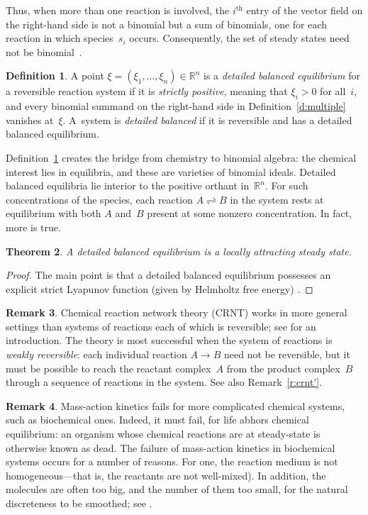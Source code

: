 \documentclass[12pt]{amsart}
\numberwithin{equation}{section}
\newtheorem{thm}{Theorem}[section]
\theoremstyle{definition}
\newtheorem{defn}[thm]{Definition}
\newtheorem{remark}[thm]{Remark}
\begin{document}
Thus, when more than one reaction is involved, the $i^{\mathrm{th}}$ entry of
the vector field on the right-hand side is not a binomial but a sum of
binomials, one for each reaction in which species~$s_i$ occurs.
Consequently, the set of steady states need not be
binomial~\cite{balancing}.

\begin{defn}\label{d:balanced}
A point $\xi = (\xi_1,\ldots,\xi_n) \in {\mathbb{R}}^n$ is a \emph{detailed
balanced equilibrium} for a reversible reaction system if it is
\emph{strictly positive}, meaning that $\xi_i > 0$ for all~$i$, and
every binomial summand on the right-hand side in
Definition~\ref{d:multiple} vanishes at~$\xi$.  A~system is
\emph{detailed balanced} if it is reversible and has a detailed
balanced equilibrium.
\end{defn}

Definition~\ref{d:balanced} creates the bridge from chemistry to
binomial algebra: the chemical interest lies in equilibria, and these
are varieties of binomial ideals.  Detailed balanced equilibria lie
interior to the positive orthant in~${\mathbb{R}}^n$.  For such concentrations
of the species, each reaction $A \rightleftharpoons B$ in the system
rests at equilibrium with both $A$ and~$B$ present at some nonzero
concentration.  In fact, more is true.

\begin{thm}\label{t:lyapunov}
A detailed balanced equilibrium is a locally attracting steady state.
\end{thm}
\begin{proof}
The main point is that a detailed balanced equilibrium possesses an
explicit strict Lyapunov function (given by Helmholtz free energy)
\cite{HJ72,feinberg87}.
\end{proof}

\begin{remark}\label{r:crnt}
Chemical reaction network theory (CRNT) works in more general settings
than systems of reactions each of which is reversible; see
\cite{gun03} for an introduction.  The theory is most successful when
the system of reactions is \emph{weakly reversible}: each individual
reaction $A \to B$ need not be reversible, but it must be possible to
reach the reactant complex~$A$ from the product complex~$B$ through a
sequence of reactions in the system.  See also Remark~\ref{r:crnt'}.
\end{remark}

\begin{remark}\label{r:fails}
Mass-action kinetics fails for more complicated chemical systems, such
as biochemical ones.  Indeed, it must fail, for life abhors chemical
equilibrium: an organism whose chemical reactions are at steady-state
is otherwise known as dead.  The failure of mass-action kinetics in
biochemical systems occurs for a number of reasons.  For one, the
reaction medium is not homogeneous---that is, the reactants are not
well-mixed).  In addition, the molecules are often too big, and the
number of them too small, for the natural discreteness to be smoothed;
see \cite[\S2]{gun03}.
\end{remark}
\end{document}
